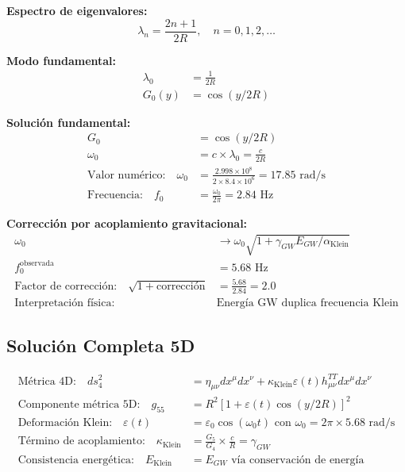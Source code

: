 \documentclass[12pt,a4paper]{article}
\begin{document}
\textbf{Espectro de eigenvalores:}
\begin{equation}
\lambda_n = \frac{2n+1}{2R}, \quad n = 0,1,2,\ldots
\end{equation}

\textbf{Modo fundamental:}
\begin{align}
\lambda_0 &= \frac{1}{2R}\\
G_0(y) &= \cos(y/2R)
\end{align}

\textbf{Solución fundamental:}
\begin{align}
G_0 &= \cos(y/2R)\\
\omega_0 &= c \times \lambda_0 = \frac{c}{2R}\\
\text{Valor numérico:} \quad \omega_0 &= \frac{2.998 \times 10^8}{2 \times 8.4 \times 10^6} = 17.85 \text{ rad/s}\\
\text{Frecuencia:} \quad f_0 &= \frac{\omega_0}{2\pi} = 2.84 \text{ Hz}
\end{align}

\textbf{Corrección por acoplamiento gravitacional:}
\begin{align}
\omega_0 &\rightarrow \omega_0\sqrt{1 + \gamma_{GW} E_{GW}/\alpha_{\text{Klein}}}\\
f_0^{\text{observada}} &= 5.68 \text{ Hz}\\
\text{Factor de corrección:} \quad \sqrt{1 + \text{corrección}} &= \frac{5.68}{2.84} = 2.0\\
\text{Interpretación física:} \quad &\text{Energía GW duplica frecuencia Klein}
\end{align}

\subsection{Solución Completa 5D}

\begin{align}
\text{Métrica 4D:} \quad ds_4^2 &= \eta_{\mu\nu} dx^\mu dx^\nu + \kappa_{\text{Klein}} \varepsilon(t) h_{\mu\nu}^{TT} dx^\mu dx^\nu\\
\text{Componente métrica 5D:} \quad g_{55} &= R^2[1 + \varepsilon(t)\cos(y/2R)]^2\\
\text{Deformación Klein:} \quad \varepsilon(t) &= \varepsilon_0 \cos(\omega_0 t) \text{ con } \omega_0 = 2\pi \times 5.68 \text{ rad/s}\\
\text{Término de acoplamiento:} \quad \kappa_{\text{Klein}} &= \frac{G_5}{G_4} \times \frac{c}{R} = \gamma_{GW}\\
\text{Consistencia energética:} \quad E_{\text{Klein}} &= E_{GW} \text{ vía conservación de energía}
\end{align}
\end{document}
